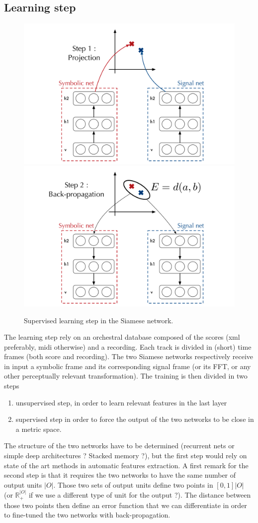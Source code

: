 \documentclass{report}
\begin{document}
\subsection{Learning step}
\begin{figure}
\centering
\includegraphics[width=0.47\linewidth]{Ideas/Siamese_net/siamese_net_projection}
\includegraphics[width=0.47\linewidth]{Ideas/Siamese_net/siamese_net_backprop}
\caption{Supervised learning step in the Siamese network.}
\end{figure}
The learning step rely on an orchestral database composed of the scores (xml preferably, midi otherwise) and a recording. Each track is divided in (short) time frames (both score and recording). The two Siamese networks respectively receive in input a symbolic frame and its corresponding signal frame (or its FFT, or any other perceptually relevant transformation).
The training is then divided in two steps
\begin{enumerate}
\item unsupervised step, in order to learn relevant features in the last layer
\item supervised step in order to force the output of the two networks to be close in a metric space.
\end{enumerate}
The structure of the two networks have to be determined (recurrent nets or simple deep architectures ? Stacked memory ?), but the first step would rely on state of the art methods in automatic features extraction.
A first remark for the second step is that it requires the two networks  to have the same number of output units $|O|$. Those two sets of output units define two points in $\left[ 0,1 \right]{|O|}$ (or $\mathbb{R}_{+} ^{|O|}$ if we use a different type of unit for the output ?). The distance between those two points then define an error function that we can differentiate in order to fine-tuned the two networks with back-propagation.
\end{document}

